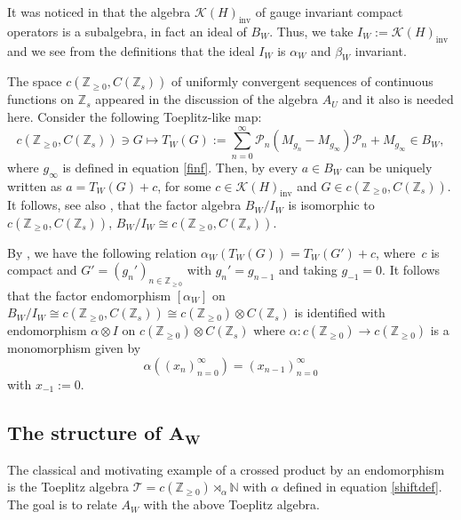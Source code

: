 \documentclass[pdftex]{sigma}
\newcommand{\N}{{\mathbb N}}
\newcommand{\Z}{{\mathbb Z}}
\numberwithin{equation}{section}
\begin{document}
It was noticed in \cite[Propositions 7.4 and 7.8]{HKMP3} that the algebra $\mathcal{K}(H)_{\mathrm{inv}}$ of gauge invariant compact operators is a subalgebra, in fact an ideal of $B_W$. Thus, we take
$
I_W:=\mathcal{K}(H)_{\mathrm{inv}}
$
and we see from the definitions that the ideal $I_W$ is $\alpha_W$ and $\beta_W$ invariant.

The space $c(\Z_{\ge0}, C(\Z_s))$ of uniformly convergent sequences of continuous functions on $\Z_s$ appeared in the discussion of the algebra $A_U$ and it also is needed here. Consider the following Toeplitz-like map:
\begin{equation*}
c(\Z_{\ge0}, C(\Z_s))\ni G\mapsto T_W(G):= \sum_{n=0}^{\infty}\mathcal{P}_n(M_{g_n}-M_{g_\infty})\mathcal{P}_n+M_{g_\infty} \in B_W,
\end{equation*}
where $g_\infty$ is defined in equation \eqref{finf}.
Then, by \cite[Proposition 7.7]{HKMP3} every $a\in B_W$ can be uniquely written as
$a=T_W(G)+c$,
for some $c\in \mathcal{K}(H)_{\mathrm{inv}}$ and $G\in c(\Z_{\ge0}, C(\Z_s))$. It follows, see also \cite[Proposition 7.8]{HKMP3}, that the factor algebra $B_W/I_W$ is isomorphic to $c(\Z_{\ge0}, C(\Z_s))$,
$
B_W/I_W\cong c(\Z_{\ge0}, C(\Z_s))$.

By \cite[Proposition 7.8]{HKMP3}, we have the following relation
$
\alpha_W(T_W(G))=T_W(G')+c$,
where~$c$ is compact and $G'=(g_n')_{n\in \Z_{\ge0}}$ with $g_n'=g_{n-1}$ and
taking $g_{-1}=0$.
It follows that the factor endomorphism $[\alpha_W]$ on $B_W/I_W\cong c(\Z_{\ge0}, C(\Z_s))\cong c(\Z_{\ge0}) \otimes C(\Z_s)$ is identified with endomorphism $\alpha\otimes I$ on $c(\Z_{\ge0}) \otimes C(\Z_s)$ where $\alpha\colon c(\Z_{\ge0})\to c(\Z_{\ge0})$ is a monomorphism given by
\begin{equation}\label{shiftdef}
\alpha((x_n)_{n=0}^\infty)= (x_{n-1})_{n=0}^\infty
\end{equation}
with $x_{-1}:=0$.

\subsection[The structure of A\_W]{The structure of $\boldsymbol{A_W}$}
The classical and motivating example of a crossed product by an endomorphism is the Toeplitz algebra \cite{Cob}
$
\mathcal{T}=c(\Z_{\ge0})\rtimes_{\alpha}\N
$
with $\alpha$ defined in equation \eqref{shiftdef}. The goal is to relate $A_W$ with the above Toeplitz algebra.
\end{document}
